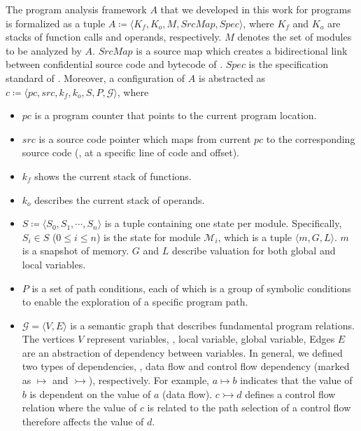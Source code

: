 The program analysis framework $A$ that we developed in this work for \wasm programs is formalized 
as a tuple $A \coloneqq \langle K_f, K_o, M, \mathit{SrcMap}, \mathit{Spec} \rangle$, 
where $K_f$ and $K_o$ are stacks of function calls and operands, respectively. 
$M$ denotes the set of modules to be analyzed by $A$. $\mathit{SrcMap}$ is a source map 
which creates a bidirectional link between confidential source code and bytecode of \wasm. 
$\mathit{Spec}$ is the specification standard of \wasm. Moreover, a configuration 
of $A$ is abstracted as $c \coloneqq \langle \mathit{pc}, \mathit{src}, k_f, k_o, S, P, \mathcal{G} \rangle$, 
where 
\begin{itemize}[leftmargin=*]
\item $\mathit{pc}$ is a program counter that points to the current program location.

\item $\mathit{src}$ is a source code pointer which maps from current $\mathit{pc}$ to 
the corresponding source code (\eg, at a specific line of code and offset).

\item $k_f$ shows the current stack of functions.

\item $k_o$ describes the current stack of operands.

\item $S \coloneqq \langle S_0, S_1, \cdots, S_n \rangle$ is a tuple containing one state per module. 
Specifically, $S_i \in S$ ($0\le i \le n$) is the state for module $\mathcal{M}_i$, which is a 
tuple $\langle m, G, L\rangle$. $m$ is a snapshot of memory. $G$ and $L$ describe valuation for 
both global and local variables. 

\item $P$ is a set of path conditions, each of which is a group of symbolic conditions to enable 
the exploration of a specific program path.

\item $\mathcal{G} = \langle V, E \rangle$ is a semantic graph that describes fundamental program 
relations. The vertices $V$ represent variables, \eg, local variable, global variable, \etc Edges 
$E$ are an abstraction of dependency between variables. In general, we defined two types of dependencies, 
\ie, data flow and control flow dependency (marked as $\mapsto$ and $\rightarrowtail$), respectively. 
For example, $a \mapsto b$ indicates that the value of $b$ is dependent on the value of $a$ (data flow). 
$c \rightarrowtail d$ defines a control flow relation where the value of $c$ is related to the path selection 
of a control flow therefore affects the value of $d$.
\end{itemize}

